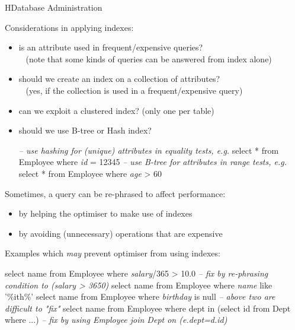 \begin{lecture}{H}{Database Administration}
\begin{slide}
Considerations in applying indexes:
\begin{itemize}
\item is an attribute used in frequent/expensive queries? \\
	~ {\small (note that some kinds of queries can be answered from index alone)}
\item should we create an index on a collection of attributes? \\
	~ {\small (yes, if the collection is used in a frequent/expensive query)}
\item can we exploit a clustered index? {\small (only one per table)}
\item should we use B-tree or Hash index?
\begin{indent}
\begin{small}
\begin{session}
    {\textit{-- use hashing for (unique) attributes in equality tests, e.g.}}
    select * from Employee where {\em{id}} = 12345
    {\textit{-- use B-tree for attributes in range tests, e.g.}}
    select * from Employee where {\em{age}} > 60
\end{session}
\end{small}
\end{indent}
\end{itemize}
\end{slide}

\begin{slide}
Sometimes, a query can be re-phrased to affect performance:
\begin{itemize}
\item by helping the optimiser to make use of indexes
\item by avoiding (unnecessary) operations that are expensive
\end{itemize}
Examples which {\it{may}} prevent optimiser from using indexes:
\begin{indent}
\begin{session}
    select name from Employee where {\em{salary}}/365 > 10.0
           {\textit{-- fix by re-phrasing condition to (salary > 3650)}}
    select name from Employee where {\em{name}} like '\%ith\%'
    select name from Employee where {\em{birthday}} is null
           {\textit{-- above two are difficult to "fix"}}
    select name from Employee
    where  dept in (select id from Dept where ...)
           {\textit{-- fix by using Employee join Dept on (e.dept=d.id)}}
\end{session}
\end{indent}
\end{slide}


\end{lecture}
